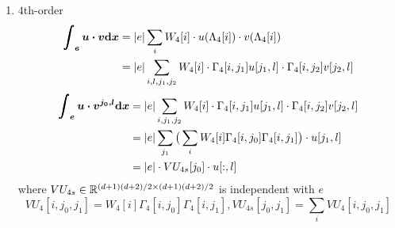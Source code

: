 \begin{enumerate}
  \item $4$th-order
    \begin{equation}\label{eq:integral-uv-all}
      \begin{split}
        \bm{\int_e u\cdot v\mathrm{d} x} &= |e| \sum_i W_4[i]
        \cdot u(\Lambda_4[i])\cdot v(\Lambda_4[i]) \\
        &= |e|\sum_{i,l,j_1,j_2}W_4[i]\cdot\Gamma_4[i,j_1]u[j_1,l]
        \cdot \Gamma_4[i,j_2]v[j_2,l]
      \end{split}
    \end{equation}
    \begin{equation}\label{eq:integral-uv}
      \begin{split}
        \bm{\int_e u\cdot v^{j_0,l}\mathrm{d} x} &= |e| \sum_{i,j_1,j_2} W_4[i]
        \cdot\Gamma_4[i,j_1]u[j_1,l]\cdot\Gamma_4[i,j_2]v[j_2,l] \\
        &= |e|\sum_{j_1}\big(\sum_{i} W_4[i]\Gamma_4[i,j_0]\Gamma_4[i,j_1]\big) 
        \cdot u[j_1,l] \\
        &= |e| \cdot VU_{4s}[j_0]\cdot u[:,l]
      \end{split}
    \end{equation}
    where $VU_{4s}\in\mathbb{R}^{(d+1)(d+2)/2\times(d+1)(d+2)/2}$ is independent with $e$
    \[
      VU_4[i,j_0,j_1]=W_4[i]\Gamma_4[i,j_0]\Gamma_4[i,j_1],
      VU_{4s}[j_0,j_1]=\sum_iVU_4[i,j_0,j_1]
    \]
\end{enumerate}
